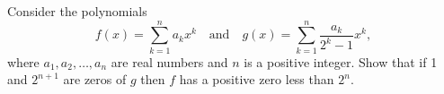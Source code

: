 Consider the polynomials \[f(x) =\sum_{k=1}^{n}a_{k}x^{k}\quad\text{and}\quad g(x) =\sum_{k=1}^{n}\frac{a_{k}}{2^{k}-1}x^{k},\] where $a_{1},a_{2},\ldots,a_{n}$ are real numbers and $n$ is a positive integer. Show that if 1 and $2^{n+1}$ are zeros of $g$ then $f$ has a positive zero less than $2^{n}$.